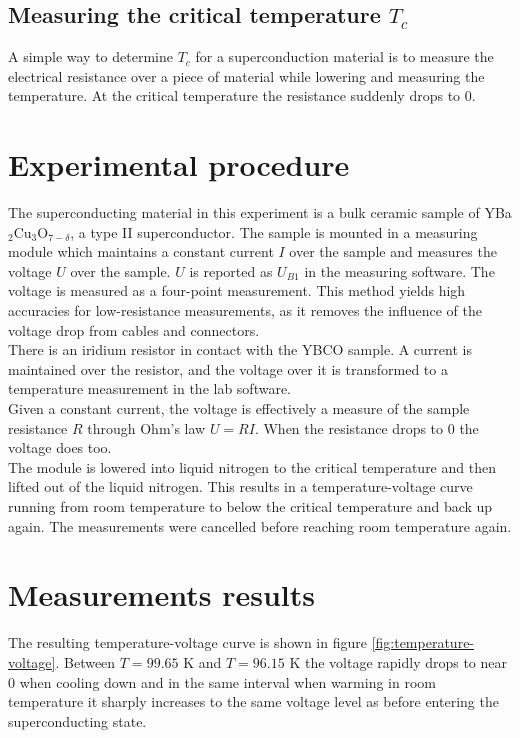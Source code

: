 \documentclass[a4paper,twoside=false,abstract=false,numbers=noenddot,
titlepage=false,headings=small,parskip=half,version=last]{scrartcl}
\begin{document}

\subsection{Measuring the critical temperature $T_c$}
A simple way to determine $T_c$ for a superconduction material is to measure the electrical resistance over a piece of material while lowering and measuring the temperature.
At the critical temperature the resistance suddenly drops to $0$.

\section{Experimental procedure}
The superconducting material in this experiment is a bulk ceramic sample of YBa$_2$Cu$_3$O$_{7-\delta}$, a type II superconductor.
The sample is mounted in a measuring module which maintains a constant current $I$ over the sample and measures the voltage $U$ over the sample. $U$ is reported as $U_{B1}$ in the measuring software. The voltage is measured as a four-point measurement. This method yields high accuracies for low-resistance measurements, as it removes the influence of the voltage drop from cables and connectors.
\\There is an iridium resistor in contact with the YBCO sample. A current is maintained over the resistor, and the voltage over it is transformed to a temperature measurement in the lab software.\\
Given a constant current, the voltage is effectively a measure of the sample resistance $R$ through Ohm's law $U=RI$. When the resistance drops to 0 the voltage does too.\\
The module is lowered into liquid nitrogen to the critical temperature and then lifted out of the liquid nitrogen.
This results in a temperature-voltage curve running from room temperature to below the critical temperature and back up again. The measurements were cancelled before reaching room temperature again.

\section{Measurements results}
The resulting temperature-voltage curve is shown in figure \ref{fig:temperature-voltage}. Between $T = 99.65$ K and $T = 96.15$ K the voltage rapidly drops to near 0 when cooling down and in the same interval when warming in room temperature it sharply increases to the same voltage level as before entering the superconducting state.
\end{document}

